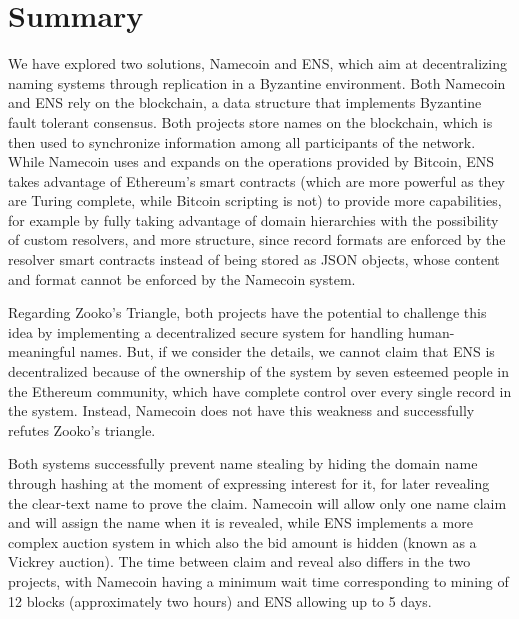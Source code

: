 \documentclass[mscthesis]{usiinfthesis}
\begin{document}
\section{Summary}

We have explored two solutions, Namecoin and ENS, which aim at decentralizing naming systems through replication in a Byzantine environment.
Both Namecoin and ENS rely on the blockchain, a data structure that implements Byzantine fault tolerant consensus. Both projects store names on the blockchain, which is then used to synchronize information among all participants of the network. While Namecoin uses and expands on the operations provided by Bitcoin, ENS takes advantage of Ethereum's smart contracts (which are more powerful as they are Turing complete, while Bitcoin scripting is not) to provide more capabilities, for example by fully taking advantage of domain hierarchies with the possibility of custom resolvers, and more structure, since record formats are enforced by the resolver smart contracts instead of being stored as JSON objects, whose content and format cannot be enforced by the Namecoin system. %

Regarding Zooko's Triangle, both projects have the potential to challenge this idea by implementing a decentralized secure system for handling human-meaningful names. But, if we consider the details, we cannot claim that ENS is decentralized because of the ownership of the system by seven esteemed people in the Ethereum community, which have complete control over every single record in the system. Instead, Namecoin does not have this weakness and successfully refutes Zooko's triangle.

Both systems successfully prevent name stealing by hiding the domain name through hashing at the moment of expressing interest for it, for later revealing the clear-text name to prove the claim. Namecoin will allow only one name claim and will assign the name when it is revealed, while ENS implements a more complex auction system in which also the bid amount is hidden (known as a Vickrey auction). The time between claim and reveal also differs in the two projects, with Namecoin having a minimum wait time corresponding to mining of 12 blocks (approximately two hours) and ENS allowing up to 5 days.
\end{document}
